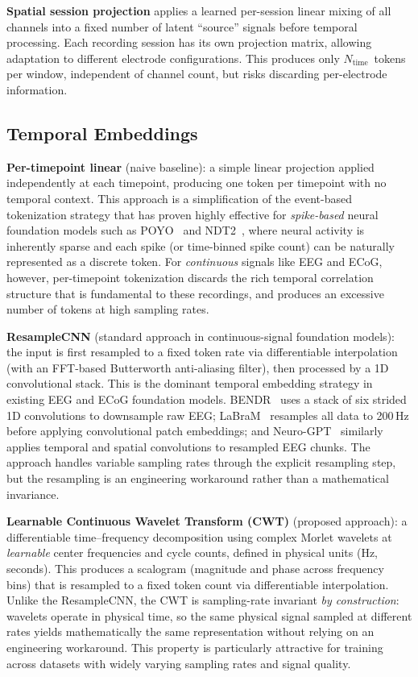 \documentclass[11pt, a4paper]{article}
\begin{document}
\textbf{Spatial session projection} applies a learned per-session linear mixing of all channels into a fixed number of latent ``source'' signals before temporal processing.  Each recording session has its own projection matrix, allowing adaptation to different electrode configurations.  This produces only $N_\text{time}$~tokens per window, independent of channel count, but risks discarding per-electrode information.

\subsection{Temporal Embeddings}

\textbf{Per-timepoint linear} (naive baseline): a simple linear projection applied independently at each timepoint, producing one token per timepoint with no temporal context.  This approach is a simplification of the event-based tokenization strategy that has proven highly effective for \emph{spike-based} neural foundation models such as POYO~\cite{azabou2023poyo} and NDT2~\cite{ye2023ndt2}, where neural activity is inherently sparse and each spike (or time-binned spike count) can be naturally represented as a discrete token.  For \emph{continuous} signals like EEG and ECoG, however, per-timepoint tokenization discards the rich temporal correlation structure that is fundamental to these recordings, and produces an excessive number of tokens at high sampling rates.

\textbf{ResampleCNN} (standard approach in continuous-signal foundation models): the input is first resampled to a fixed token rate via differentiable interpolation (with an FFT-based Butterworth anti-aliasing filter), then processed by a 1D convolutional stack.  This is the dominant temporal embedding strategy in existing EEG and ECoG foundation models.  BENDR~\cite{kostas2021bendr} uses a stack of six strided 1D convolutions to downsample raw EEG; LaBraM~\cite{jiang2024labram} resamples all data to 200\,Hz before applying convolutional patch embeddings; and Neuro-GPT~\cite{cui2024neurogpt} similarly applies temporal and spatial convolutions to resampled EEG chunks.  The approach handles variable sampling rates through the explicit resampling step, but the resampling is an engineering workaround rather than a mathematical invariance.

\textbf{Learnable Continuous Wavelet Transform (CWT)} (proposed approach): a differentiable time--frequency decomposition using complex Morlet wavelets at \emph{learnable} center frequencies and cycle counts, defined in physical units (Hz, seconds).  This produces a scalogram (magnitude and phase across frequency bins) that is resampled to a fixed token count via differentiable interpolation.  Unlike the ResampleCNN, the CWT is sampling-rate invariant \emph{by construction}: wavelets operate in physical time, so the same physical signal sampled at different rates yields mathematically the same representation without relying on an engineering workaround.  This property is particularly attractive for training across datasets with widely varying sampling rates and signal quality.
\end{document}
